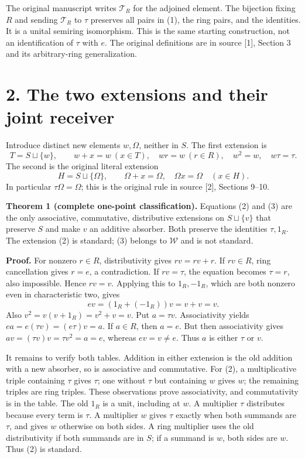 \documentclass[
]{article}
\begin{document}
The original manuscript writes \(\mathcal T_R\) for the adjoined
element. The bijection fixing \(R\) and sending \(\mathcal T_R\) to
\(\tau\) preserves all pairs in (1), the ring pairs, and the identities.
It is a unital semiring isomorphism. This is the same starting
construction, not an identification of \(\tau\) with \(e\). The original
definitions are in source {[}1{]}, Section 3 and its arbitrary-ring
generalization.

\section{2. The two extensions and their joint
receiver}\label{the-two-extensions-and-their-joint-receiver}

Introduce distinct new elements \(w,\Omega\), neither in \(S\). The
first extension is \[
T=S\sqcup\{w\},\qquad
w+x=w\ (x\in T),\quad wr=w\ (r\in R),\quad
w^2=w,\quad w\tau=\tau.
\tag{2}
\] The second is the original literal extension \[
H=S\sqcup\{\Omega\},\qquad
\Omega+x=\Omega,\quad \Omega x=\Omega\quad(x\in H).
\tag{3}
\] In particular \(\tau\Omega=\Omega\); this is the original rule in
source {[}2{]}, Sections 9--10.

\textbf{Theorem 1 (complete one-point classification).} Equations (2)
and (3) are the only associative, commutative, distributive extensions
on \(S\sqcup\{v\}\) that preserve \(S\) and make \(v\) an additive
absorber. Both preserve the identities \(\tau,1_R\). The extension (2)
is standard; (3) belongs to \(\mathcal W\) and is not standard.

\textbf{Proof.} For nonzero \(r\in R\), distributivity gives
\(rv=rv+r\). If \(rv\in R\), ring cancellation gives \(r=e\), a
contradiction. If \(rv=\tau\), the equation becomes \(\tau=r\), also
impossible. Hence \(rv=v\). Applying this to \(1_R,-1_R\), which are
both nonzero even in characteristic two, gives \[
ev=(1_R+(-1_R))v=v+v=v.
\] Also \(v^2=v(v+1_R)=v^2+v=v\). Put \(a=\tau v\). Associativity yields
\(ea=e(\tau v)=(e\tau)v=a\). If \(a\in R\), then \(a=e\). But then
associativity gives \(av=(\tau v)v=\tau v^2=a=e\), whereas
\(ev=v\ne e\). Thus \(a\) is either \(\tau\) or \(v\).

It remains to verify both tables. Addition in either extension is the
old addition with a new absorber, so is associative and commutative. For
(2), a multiplicative triple containing \(\tau\) gives \(\tau\); one
without \(\tau\) but containing \(w\) gives \(w\); the remaining triples
are ring triples. These observations prove associativity, and
commutativity is in the table. The old \(1_R\) is a unit, including at
\(w\). A multiplier \(\tau\) distributes because every term is \(\tau\).
A multiplier \(w\) gives \(\tau\) exactly when both summands are
\(\tau\), and gives \(w\) otherwise on both sides. A ring multiplier
uses the old distributivity if both summands are in \(S\); if a summand
is \(w\), both sides are \(w\). Thus (2) is standard.
\end{document}
